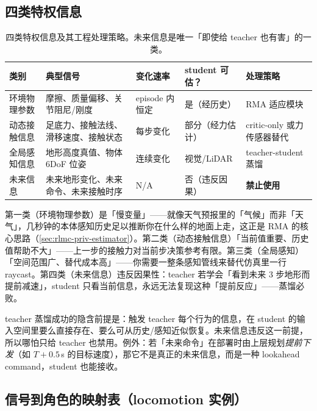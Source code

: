\subsection{四类特权信息}
\label{sec:rlmc-priv-fourclass}

\begin{table}[H]
\centering
\small
\caption{四类特权信息及其工程处理策略。未来信息是唯一「即使给 teacher 也有害」的一类。}
\label{tab:rlmc-priv-fourclass}
\begin{tabular}{@{}p{2.0cm}p{3.0cm}p{1.7cm}p{1.6cm}p{3.4cm}@{}}
\toprule
类别 & 典型信号 & 变化速率 & student 可估？ & 处理策略 \\
\midrule
环境物理参数 & 摩擦、质量偏移、关节阻尼/刚度 & episode 内恒定 & 是（经历史） & RMA 适应模块 \\
动态接触信息 & 足底力、接触法线、滑移速度、接触状态 & 每步变化 & 部分（经力估计） & critic-only 或力传感器替代 \\
全局感知信息 & 地形高度真值、物体 6DoF 位姿 & 连续变化 & 视觉/LiDAR & teacher-student 蒸馏 \\
未来信息 & 未来地形变化、未来命令、未来接触时序 & N/A & 否（违反因果） & \textbf{禁止使用} \\
\bottomrule
\end{tabular}
\end{table}

第一类（环境物理参数）是「慢变量」——就像天气预报里的「气候」而非「天气」，几秒钟的本体感知历史足以推断你在什么样的地面上走，这正是 RMA 的核心思路（\cref{sec:rlmc-priv-estimator}）。第二类（动态接触信息）「当前值重要、历史值帮助不大」——上一步的接触力对当前步决策参考有限。第三类（全局感知）「空间范围广、替代成本高」——你需要一整条感知管线来替代仿真里一行 raycast。第四类（未来信息）违反因果性：teacher 若学会「看到未来 3 步地形而提前减速」，student 只看当前信息，永远无法复现这种「提前反应」——蒸馏必败。

\begin{insight}\label{ins:rlmc-priv-explain}
teacher 蒸馏成功的隐含前提是：触发 teacher 每个行为的信息，在 student 的输入空间里要么直接存在、要么可从历史/感知近似恢复。未来信息违反这一前提，所以哪怕只给 teacher 也禁用。例外：若「未来命令」在部署时由上层规划\emph{提前下发}（如 $T{+}0.5$\,s 的目标速度），那它不是真正的未来信息，而是一种 lookahead command，student 也能接收。
\end{insight}

\subsection{信号到角色的映射表（locomotion 实例）}
\label{sec:rlmc-priv-mapping}

